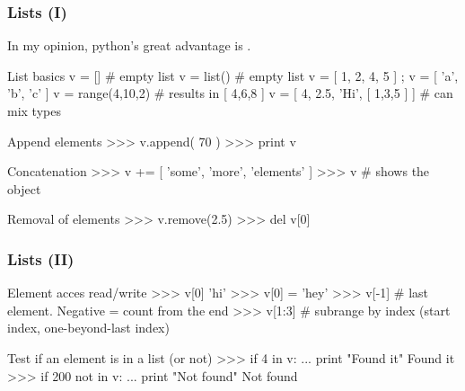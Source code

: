 \documentclass[hyperref={colorlinks=true}]{beamer}
\begin{document}

\begin{frame}[fragile]
  \frametitle{Lists (I)}

  In my opinion, python's great advantage is .

    \begin{ucpythonblock}{List basics}
v = []   # empty list
v = list()  # empty list
v = [ 1, 2, 4, 5 ]  ; v = [ 'a', 'b', 'c' ]
v = range(4,10,2) # results in [ 4,6,8 ]
v = [ 4, 2.5, 'Hi', [ 1,3,5 ] ]  # can mix types    
    \end{ucpythonblock}

    \begin{ucpythonblock}{Append elements}
>>> v.append( 70 )
>>> print v  
    \end{ucpythonblock}
    
    \begin{ucpythonblock}{Concatenation}
>>> v += [ 'some', 'more', 'elements' ]
>>> v  # shows the object
    \end{ucpythonblock}
    
    \begin{ucpythonblock}{Removal of elements}
>>> v.remove(2.5)
>>> del v[0]
    \end{ucpythonblock}

\end{frame}



\begin{frame}[fragile]
  \frametitle{Lists (II)}

    \begin{ucpythonblock}{Element acces read/write}
>>> v[0]
'hi'
>>> v[0] = 'hey'
>>> v[-1] # last element. Negative = count from the end
>>> v[1:3] # subrange by index (start index, one-beyond-last index) 
    \end{ucpythonblock}

    \begin{ucpythonblock}{Test if an element is in a list (or not)}
>>> if 4 in v:
...   print "Found it"
Found it
>>> if 200 not in v:
...   print "Not found"
Not found
    \end{ucpythonblock}

\end{frame}

\end{document}
